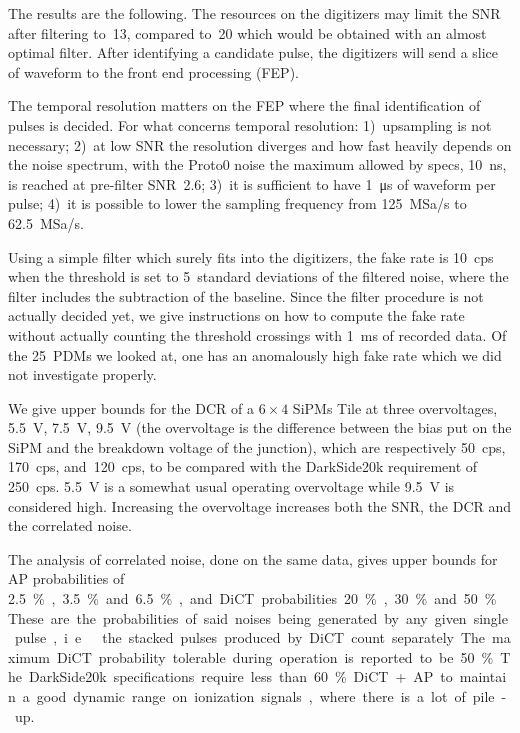 \documentclass[11pt]{article}
\begin{document}
    The results are the following. The resources on the digitizers may limit
    the SNR after filtering to~13, compared to~20 which would be obtained with
    an almost optimal filter. After identifying a candidate pulse, the
    digitizers will send a slice of waveform to the front end processing (FEP).
    
    The temporal resolution matters on the FEP where the final identification
    of pulses is decided. For what concerns temporal resolution: 1)~upsampling
    is not necessary; 2)~at low SNR the resolution diverges and how fast
    heavily depends on the noise spectrum, with the Proto0 noise the maximum
    allowed by specs, \SI{10}{ns}, is reached at pre-filter SNR~2.6; 3)~it is
    sufficient to have \SI{1}{\micro s} of waveform per pulse; 4)~it is
    possible to lower the sampling frequency from \SI{125}{MSa/s} to
    \SI{62.5}{MSa/s}.
    
    Using a simple filter which surely fits into the digitizers, the fake rate
    is \SI{10}{cps} when the threshold is set to 5~standard deviations of the
    filtered noise, where the filter includes the subtraction of the baseline.
    Since the filter procedure is not actually decided yet, we give
    instructions on how to compute the fake rate without actually counting the
    threshold crossings with \SI{1}{ms} of recorded data. Of the 25~PDMs we
    looked at, one has an anomalously high fake rate which we did not
    investigate properly.
    
    We give upper bounds for the DCR of a $6\times4$ SiPMs Tile at three
    overvoltages, \SI{5.5}{V}, \SI{7.5}{V}, \SI{9.5}{V} (the overvoltage is the
    difference between the bias put on the SiPM and the breakdown voltage of
    the junction), which are respectively \SI{50}{cps}, \SI{170}{cps},
    and~\SI{120}{cps}, to be compared with the DarkSide20k requirement of
    \SI{250}{cps}. \SI{5.5}{V} is a somewhat usual operating overvoltage while
    \SI{9.5}{V} is considered high. Increasing the overvoltage increases both
    the SNR, the DCR and the correlated noise.
    
    The analysis of correlated noise, done on the same data, gives upper bounds
    for AP probabilities of \SI{2.5}\%, \SI{3.5}\% and \SI{6.5}\%, and DiCT
    probabilities \SI{20}\%, \SI{30}\% and~\SI{50}\%. These are the
    probabilities of said noises being generated by any given single pulse,
    i.e.\ the stacked pulses produced by DiCT count separately. The maximum
    DiCT probability tolerable during operation is reported to be \SI{50}\%.
    The DarkSide20k specifications require less than \SI{60}\% DiCT+AP to
    maintain a good dynamic range on ionization signals, where there is a lot
    of pile-up.
    
\end{document}
